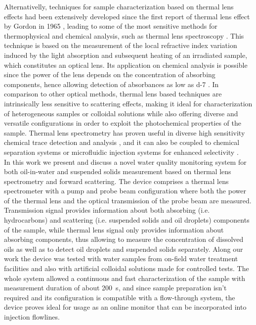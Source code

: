 \documentclass[10pt,authoryear,twocolumn]{article}
\begin{document}
Alternativelly, techniques for sample characterization based on thermal lens effects had been extensively developed since the first report of thermal lens effect by Gordon in 1965 \citep{Gordon1965}, leading to some of the most sensitive methods for thermophysical and chemical analysis, such as thermal lens spectroscopy \citep{Franko2010,Liu2016}. This technique is based on the measurement of the local refractive index variation induced by the light absorption and subsequent heating of an irradiated sample, which constitutes an optical lens. Its application on chemical analysis is possible since the power of the lens depends on the concentration of absorbing components, hence allowing detection of absorbances as low as \SI{d-7}{\arb} \citep{Proskurnin2015}. In comparison to other optical methods, thermal lens based techniques are intrinsically less sensitive to scattering effects, making it ideal for characterization of heterogeneous samples or colloidal solutions while also offering diverse and versatile configurations in order to exploit the photochemical properties of the sample. Thermal lens spectrometry has proven useful in diverse high sensitivity chemical trace detection and analysis \citep{Sikovec1996,Franko2010}, and it can also be coupled to chemical separation systems or microfluidic injection systems for enhanced selectivity \citep{Liu2016}. \\

In this work we present and discuss a novel water quality monitoring system for both oil-in-water and suspended solids measurement based on thermal lens spectrometry and forward scattering. The device comprises a thermal lens spectrometer with a pump and probe beam configuration where both the power of the thermal lens and the optical transmission of the probe beam are measured. Transmission signal provides information about both absorbing (i.e. hydrocarbons) and scattering (i.e. suspended solids and oil droplets) components of the sample, while thermal lens signal only provides information about absorbing components, thus allowing to measure the concentration of dissolved oils as well as to detect oil droplets and suspended solids separately. Along our work the device was tested with water samples from on-field water treatment facilities and also with artificial colloidal solutions made for controlled tests. The whole system allowed a continuous and fast characterization of the sample with measurement duration of about \SI{200}{\second}, and since sample preparation isn't required and its configuration is compatible with a flow-through system, the device proves ideal for usage as an online monitor that can be incorporated into injection flowlines.
\end{document}
